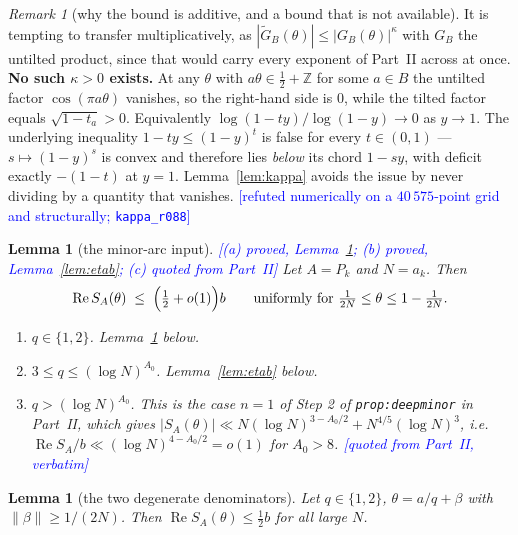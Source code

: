 \documentclass[11pt,a4paper]{article}
\theoremstyle{plain}
\newtheorem{lemma}[theorem]{Lemma}
\theoremstyle{definition}
\theoremstyle{remark}
\newtheorem{remark}[theorem]{Remark}
\newcommand{\STATUS}[1]{\textcolor{blue}{\textsf{[#1]}}}
\newcommand{\Xlab}[2]{\textup{\texttt{#2}}}
\begin{document}
\begin{remark}[why the bound is additive, and a bound that is not available]\label{rem:noKappa}
It is tempting to transfer multiplicatively, as $|\widetilde G_B(\theta)|\le|G_B(\theta)|^{\kappa}$
with $G_B$ the untilted product, since that would carry every exponent of Part~II across at
once. \textbf{No such $\kappa>0$ exists.} At any $\theta$ with $a\theta\in\tfrac12+\mathbb Z$ for
some $a\in B$ the untilted factor $\cos(\pi a\theta)$ vanishes, so the right-hand side is $0$,
while the tilted factor equals $\sqrt{1-t_a}>0$. Equivalently
$\log(1-ty)/\log(1-y)\to0$ as $y\to1$. The underlying inequality
$1-ty\le(1-y)^{t}$ is false for every $t\in(0,1)$ --- $s\mapsto(1-y)^{s}$ is convex and
therefore lies \emph{below} its chord $1-sy$, with deficit exactly $-(1-t)$ at $y=1$.
Lemma~\ref{lem:kappa} avoids the issue by never dividing by a quantity that vanishes.
\STATUS{refuted numerically on a $40\,575$-point grid and structurally; \texttt{kappa\_r088}}
\end{remark}

\begin{lemma}[the minor-arc input]\label{lem:eta}
\STATUS{(a) proved, Lemma~\ref{lem:etaa}; (b) proved, Lemma~\ref{lem:etab}; (c) quoted from Part~II}
Let $A=P_k$ and $N=a_k$. Then
\[
  \operatorname{Re}S_A(\theta)\;\le\;\Bigl(\tfrac12+o(1)\Bigr)b
  \qquad\text{uniformly for }\tfrac1{2N}\le\theta\le1-\tfrac1{2N}.
\]
\begin{enumerate}
\item[(a)] \emph{$q\in\{1,2\}$.} Lemma~\ref{lem:etaa} below.
\item[(b)] \emph{$3\le q\le(\log N)^{A_0}$.} Lemma~\ref{lem:etab} below.
\item[(c)] \emph{$q>(\log N)^{A_0}$.} This is the case $n=1$ of Step 2 of
  \Xlab{paper2}{prop:deepminor} in Part~II, which gives
  $|S_A(\theta)|\ll N(\log N)^{3-A_0/2}+N^{4/5}(\log N)^{3}$, i.e.\
  $\operatorname{Re}S_A/b\ll(\log N)^{4-A_0/2}=o(1)$ for $A_0>8$.
  \STATUS{quoted from Part~II, verbatim}
\end{enumerate}
\end{lemma}

\begin{lemma}[the two degenerate denominators]\label{lem:etaa}
Let $q\in\{1,2\}$, $\theta=a/q+\beta$ with $\|\beta\|\ge1/(2N)$. Then
$\operatorname{Re}S_A(\theta)\le\tfrac12b$ for all large $N$.
\end{lemma}
\end{document}
